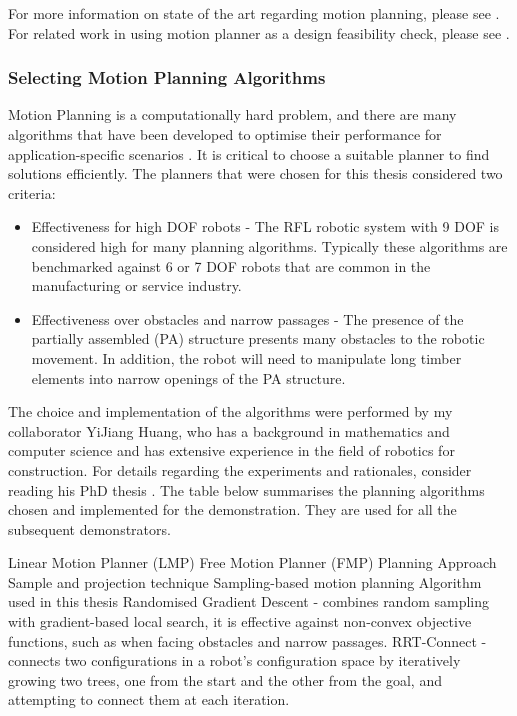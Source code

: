 For more information on state of the art regarding motion planning, please see \parencite{garrettIntegratedTaskMotion2021a}. For related work in using motion planner as a design feasibility check, please see \parencite{gandiaAutomaticPathPlanning2018}. 

\subsubsection{Selecting Motion Planning Algorithms}
\label{subsubsection:exploration_2_selecting_motion_planning_algorithms}

Motion Planning is a computationally hard problem, and there are many algorithms that have been developed to optimise their performance for application-specific scenarios \parencite{lavallePlanningAlgorithms2006}. It is critical to choose a suitable planner to find solutions efficiently. The planners that were chosen for this thesis considered two criteria:
\begin{itemize}
    \item Effectiveness for high DOF robots - The RFL robotic system with 9 DOF is considered high for many planning algorithms. Typically these algorithms are benchmarked against 6 or 7 DOF robots that are common in the manufacturing or service industry.
    \item Effectiveness over obstacles and narrow passages - The presence of the partially assembled (PA) structure presents many obstacles to the robotic movement. In addition, the robot will need to manipulate long timber elements into narrow openings of the PA structure.
\end{itemize}

The choice and implementation of the algorithms were performed by my collaborator YiJiang Huang, who has a background in mathematics and computer science and has extensive experience in the field of robotics for construction. For details regarding the experiments and rationales, consider reading his PhD thesis \parencite{huangAlgorithmicPlanningRobotic2022}. The table below summarises the planning algorithms chosen and implemented for the demonstration. They are used for all the subsequent demonstrators.

Linear Motion Planner (LMP)
Free Motion Planner (FMP)
Planning Approach
Sample and projection technique
Sampling-based motion planning
Algorithm used in this thesis
Randomised Gradient Descent \parencite{yaoPathPlanningGeneral2007} - combines random sampling with gradient-based local search, it is effective against non-convex objective functions, such as when facing obstacles and narrow passages.
RRT-Connect \parencite{kuffnerjr.RRTConnectEfficientApproach2000} - connects two configurations in a robot's configuration space by iteratively growing two trees, one from the start and the other from the goal, and attempting to connect them at each iteration.


